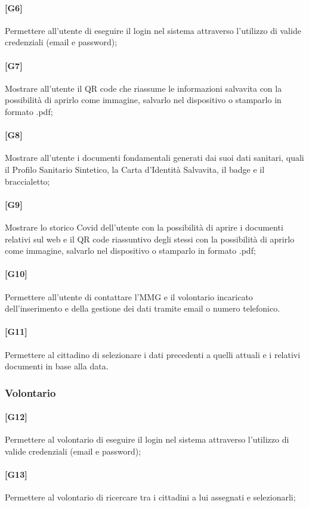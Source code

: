 \documentclass[12pt,a4paper,twoside,openright,titlepage]{book}
\begin{document}
\paragraph{[G6]} Permettere all'utente di eseguire il login nel sistema attraverso l'utilizzo di valide credenziali (email e password);
\paragraph{[G7]} Mostrare all'utente il QR code che riassume le informazioni salvavita con la possibilità di aprirlo come immagine, salvarlo nel dispositivo o stamparlo in formato .pdf;
\paragraph{[G8]} Mostrare all'utente i documenti fondamentali generati dai suoi dati sanitari, quali il Profilo Sanitario Sintetico, la Carta d'Identità Salvavita, il badge e il braccialetto;
\paragraph{[G9]} Mostrare lo storico Covid dell'utente con la possibilità di aprire i documenti relativi sul web e il QR code riassuntivo degli stessi con la possibilità di aprirlo come immagine, salvarlo nel dispositivo o stamparlo in formato .pdf;
\paragraph{[G10]} Permettere all'utente di contattare l'MMG e il volontario incaricato dell'inserimento e della gestione dei dati tramite email o numero telefonico.
\paragraph{[G11]} Permettere al cittadino di selezionare i dati precedenti a quelli attuali e i relativi documenti in base alla data.

\subsubsection{Volontario}
\paragraph{[G12]} Permettere al volontario di eseguire il login nel sistema attraverso l'utilizzo di valide credenziali (email e password);
\paragraph{[G13]} Permettere al volontario di ricercare tra i cittadini a lui assegnati e selezionarli;
\end{document}
